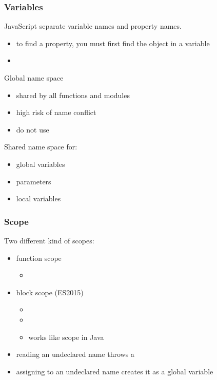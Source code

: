 \begin{frame}[fragile] \frametitle{Variables}
JavaScript separate variable names and property names.
\begin{itemize}
 \item to find a property, you must first find the object in a variable
 \item {}
\end{itemize}
\vspace{3mm}
Global name space
\begin{itemize}
  \item shared by all functions and modules
  \item high risk of name conflict
  \item do not use
\end{itemize}
\vspace{3mm}
Shared name space for:
\begin{itemize}
  \item  global variables
  \item parameters
  \item local variables
\end{itemize}
\end{frame}

\begin{frame}[fragile] \frametitle{Scope}
Two different kind of scopes:
\begin{itemize}
  \item  function scope
  \begin{itemize}
    \item {}
  \end{itemize}
  \item block scope (ES2015)
  \begin{itemize}
    \item {}
    \item {}
    \item works like scope in Java
  \end{itemize}
\end{itemize}
\vspace{4mm}
\begin{itemize}
  \item reading an undeclared name throws a 
  \item assigning to an undeclared name creates it as a global variable
\end{itemize}

\end{frame}

